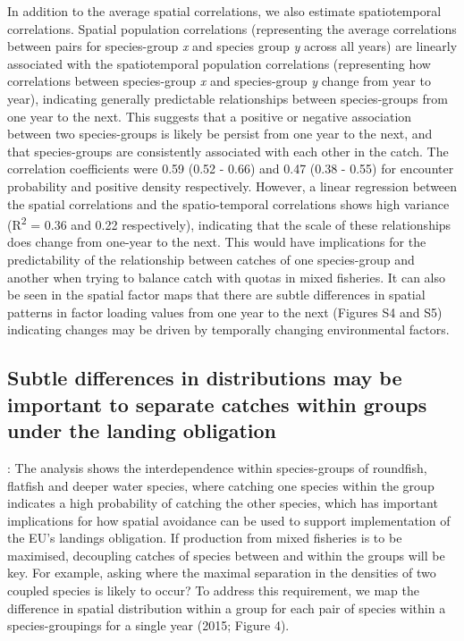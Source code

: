 \documentclass{nature}
\begin{document}
\begin{linenumbers}
In addition to the average spatial correlations, we also estimate
spatiotemporal correlations. Spatial population correlations (representing the
average correlations between pairs for species-group \textit{x} and species
group \textit{y} across all years) are linearly associated with the
spatiotemporal population correlations (representing how correlations between
species-group \textit{x} and species-group \textit{y} change from year to
year), indicating generally predictable relationships between species-groups
from one year to the next. This suggests that a positive or negative
association between two species-groups is likely be persist from one year to
the next, and that species-groups are consistently associated with each other
in the catch. The correlation coefficients were 0.59 (0.52 - 0.66) and 0.47
(0.38 - 0.55) for encounter probability and positive density respectively.
However, a linear regression between the spatial correlations and the
spatio-temporal correlations shows high variance (R\textsuperscript{2} = 0.36
and 0.22 respectively), indicating that the scale of these relationships does
change from one-year to the next. This would have implications for the
predictability of the relationship between catches of one species-group and
another when trying to balance catch with quotas in mixed fisheries. It can
also be seen in the spatial factor maps that there are subtle differences in
spatial patterns in factor loading values from one year to the next (Figures S4
and S5) indicating changes may be driven by temporally changing environmental
factors.


\subsection{Subtle differences in distributions may be important to separate
	catches within groups under the landing obligation}: The analysis shows
the interdependence within species-groups of roundfish, flatfish and deeper
water species, where catching one species within the group indicates a high
probability of catching the other species, which has important implications for
how spatial avoidance can be used to support implementation of the EU's
landings obligation. If production from mixed fisheries is to be maximised,
decoupling catches of species between and within the groups will be key. For
example, asking where the maximal separation in the densities of two coupled
species is likely to occur? To address this requirement, we map the difference
in spatial distribution within a group for each pair of species within a
species-groupings for a single year (2015; Figure 4). 


\end{linenumbers}
\end{document}
